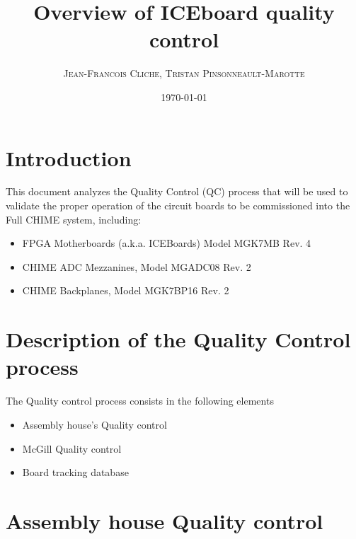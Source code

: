 \documentclass[11pt,article]{memoir}
\author{\textsc{Jean-Francois Cliche},
		\textsc{Tristan Pinsonneault-Marotte}\\
		}
\title{Overview of ICEboard quality control}%
\date{\today}
\begin{document}
\maketitle

\section{Introduction}
\label{sec:intro}
This document analyzes the Quality Control (QC) process that will be used to
validate the proper operation of the circuit boards to be commissioned into the Full CHIME system, including:

\begin{itemize}
\item FPGA Motherboards (a.k.a. ICEBoards) Model MGK7MB Rev. 4
\item CHIME ADC Mezzanines, Model MGADC08 Rev. 2
\item CHIME Backplanes, Model MGK7BP16 Rev. 2
\end{itemize}


\section{Description of the Quality Control process}

The Quality control process consists in the following elements
\begin{itemize}
\item Assembly house's Quality control
\item McGill Quality control
\item Board tracking database
\end{itemize}


\section{Assembly house Quality control}


\end{document}
